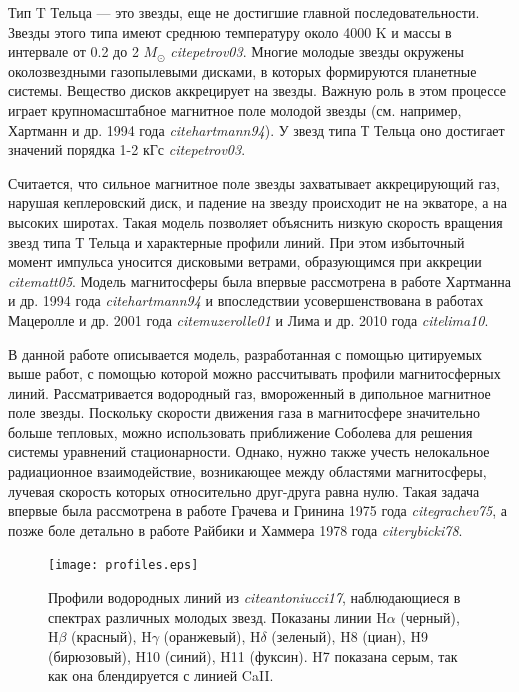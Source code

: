 \documentclass{article}
\begin{document}
Тип T Тельца --- это звезды, еще не достигшие главной последовательности. Звезды этого типа имеют среднюю температуру около 4000 K и массы в интервале от 0.2 до 2 $M_\odot$ \textit{cite{petrov03}}. Многие молодые звезды окружены околозвездными газопылевыми дисками, в которых формируются планетные системы. Вещество дисков аккрецирует на звезды. Важную роль в этом процессе играет крупномасштабное магнитное поле молодой звезды (см. например, Хартманн и др. 1994 года \textit{cite{hartmann94}}). У звезд типа Т Тельца оно достигает значений порядка 1-2 кГс \textit{cite{petrov03}}.

Считается, что сильное магнитное поле звезды захватывает аккрецирующий газ, нарушая кеплеровский диск, и падение на звезду происходит не на экваторе, а на высоких широтах. Такая модель позволяет объяснить низкую скорость вращения звезд типа Т Тельца и характерные профили линий. При этом избыточный момент импульса уносится дисковыми ветрами, образующимся при аккреции \textit{cite{matt05}}. Модель магнитосферы была впервые рассмотрена в работе Хартманна и др. 1994 года \textit{cite{hartmann94}} и впоследствии усовершенствована в работах Мацеролле и др. 2001 года \textit{cite{muzerolle01}} и Лима и др. 2010 года \textit{cite{lima10}}.

В данной работе описывается модель, разработанная с помощью цитируемых выше работ, с помощью которой можно рассчитывать профили магнитосферных линий. Рассматривается водородный газ, вмороженный в дипольное магнитное поле звезды. Поскольку скорости движения газа в магнитосфере значительно больше тепловых, можно использовать приближение Соболева для решения системы уравнений стационарности. Однако, нужно также учесть нелокальное радиационное взаимодействие, возникающее между областями магнитосферы, лучевая скорость которых относительно друг-друга равна нулю. Такая задача впервые была рассмотрена в работе Грачева и Гринина 1975 года \textit{cite{grachev75}}, а позже боле детально в работе Райбики и Хаммера 1978 года \textit{cite{rybicki78}}. 

\begin{figure}[h] 
\centering
\texttt{[image: profiles.eps]}
\caption{Профили водородных линий из \textit{cite{antoniucci17}}, наблюдающиеся в спектрах различных молодых звезд. Показаны линии $\text{H}\alpha$ (черный), $\text{H}\beta$ (красный), $\text{H}\gamma$ (оранжевый), $\text{H}\delta$ (зеленый), H8 (циан), H9 (бирюзовый), H10 (синий), H11 (фуксин). H7 показана серым, так как она блендируется с линией CaII. }
\label{fig:profiles}
\end{figure}
\end{document}
